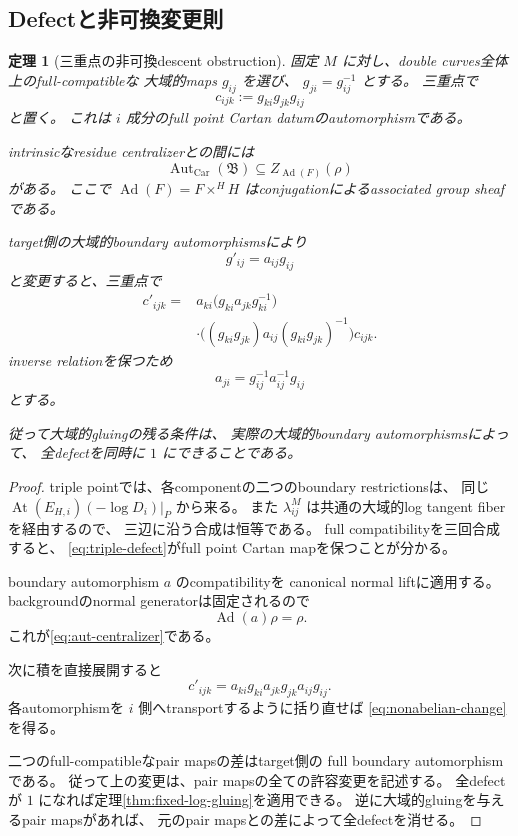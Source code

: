 \documentclass[uplatex,dvipdfmx,11pt]{jsarticle}
\numberwithin{equation}{section}
\theoremstyle{plain}
\newtheorem{theorem}{定理}[section]
\theoremstyle{definition}
\theoremstyle{remark}
\DeclareMathOperator{\At}{At}
\DeclareMathOperator{\Ad}{Ad}
\DeclareMathOperator{\Aut}{Aut}
\newcommand{\Car}{\mathrm{Car}}
\newcommand{\calB}{\mathfrak B}
\begin{document}
\subsection{Defectと非可換変更則}

\begin{theorem}[三重点の非可換descent obstruction]
\label{thm:triple-obstruction}
固定 \(M\) に対し、double curves全体上のfull-compatibleな
大域的maps \(g_{ij}\) を選び、
\(g_{ji}=g_{ij}^{-1}\) とする。
三重点で
\begin{equation}
\label{eq:triple-defect}
c_{ijk}:=g_{ki}g_{jk}g_{ij}
\end{equation}
と置く。
これは \(i\) 成分のfull point Cartan datumのautomorphismである。

intrinsicなresidue centralizerとの間には
\begin{equation}
\label{eq:aut-centralizer}
\Aut_{\Car}(\calB)
\subseteq Z_{\Ad(F)}(\rho)
\end{equation}
がある。
ここで \(\Ad(F)=F\times^H H\) はconjugationによるassociated group sheafである。

target側の大域的boundary automorphismsにより
\[
g'_{ij}=a_{ij}g_{ij}
\]
と変更すると、三重点で
\begin{equation}
\label{eq:nonabelian-change}
\begin{split}
c'_{ijk}
={}&a_{ki}
\bigl(g_{ki}a_{jk}g_{ki}^{-1}\bigr)\\
&\cdot
\bigl((g_{ki}g_{jk})a_{ij}(g_{ki}g_{jk})^{-1}\bigr)c_{ijk}.
\end{split}
\end{equation}
inverse relationを保つため
\[
a_{ji}=g_{ij}^{-1}a_{ij}^{-1}g_{ij}
\]
とする。

従って大域的gluingの残る条件は、
実際の大域的boundary automorphismsによって、
全defectを同時に \(1\) にできることである。
\end{theorem}

\begin{proof}
triple pointでは、各componentの二つのboundary restrictionsは、
同じ
\(\At(E_{H,i})(-\log D_i)\allowbreak|_P\)
から来る。
また \(\lambda^M_{ij}\) は共通の大域的log tangent fiberを経由するので、
三辺に沿う合成は恒等である。
full compatibilityを三回合成すると、
\eqref{eq:triple-defect}がfull point Cartan mapを保つことが分かる。

boundary automorphism \(a\) のcompatibilityを
canonical normal liftに適用する。
backgroundのnormal generatorは固定されるので
\[
\Ad(a)\rho=\rho.
\]
これが\eqref{eq:aut-centralizer}である。

次に積を直接展開すると
\[
c'_{ijk}=a_{ki}g_{ki}a_{jk}g_{jk}a_{ij}g_{ij}.
\]
各automorphismを \(i\) 側へtransportするように括り直せば
\eqref{eq:nonabelian-change}を得る。

二つのfull-compatibleなpair mapsの差はtarget側の
full boundary automorphismである。
従って上の変更は、pair mapsの全ての許容変更を記述する。
全defectが \(1\) になれば定理\ref{thm:fixed-log-gluing}を適用できる。
逆に大域的gluingを与えるpair mapsがあれば、
元のpair mapsとの差によって全defectを消せる。
\end{proof}
\end{document}
